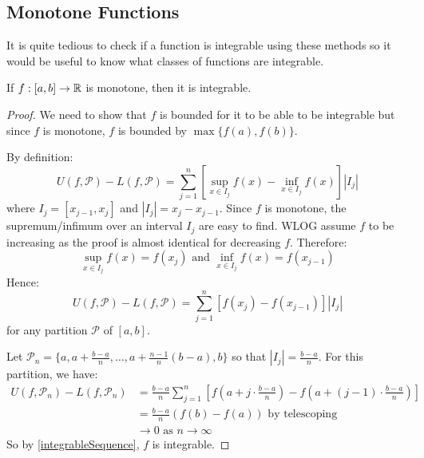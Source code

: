 \documentclass[../main.tex]{subfiles}
\begin{document}
\subsection{Monotone Functions}
It is quite tedious to check if a function is integrable using these methods so it would be useful to know what classes of functions are integrable.
\begin{proposition}
  If $f: [a, b] \to \mathbb{R}$ is monotone, then it is integrable.
  \label{motoneIntegrable}
\end{proposition}
\begin{proof}
  We need to show that $f$ is bounded for it to be able to be integrable but since $f$ is monotone, $f$ is bounded by $\max\{f(a), f(b)\}$.

  By definition:
  \[
    U(f, \mathcal{P}) -L(f, \mathcal{P}) = \sum_{j = 1}^{n} \left[\sup_{x \in I_{j}} f(x) - \inf_{x \in I_j} f(x)\right]|I_j|
  \]
  where $I_j = [x_{j - 1}, x_j]$ and $|I_j| = x_j - x_{j - 1}$.
  Since $f$ is monotone, the supremum/infimum over an interval $I_j$ are easy to find.
  WLOG assume $f$ to be increasing as the proof is almost identical for decreasing $f$.
  Therefore:
  \[
    \sup_{x \in I_j} f(x) = f(x_j) \text{ and } \inf_{x \in I_j}  f(x) = f(x_{j - 1})
  \]
  Hence:
  \[
    U(f, \mathcal{P}) - L(f, \mathcal{P}) = \sum_{j = 1}^{n} [f(x_j) - f(x_{j - 1})]|I_j|
  \]
  for any partition $\mathcal{P}$ of $[a, b]$.

  Let $\mathcal{P}_n = \{a, a + \frac{b - a}{n}, \ldots, a + \frac{n - 1}{n}(b - a), b\}$ so that $|I_j| = \frac{b - a}{n}$.
  For this partition, we have:
  \begin{align*}
    U(f, \mathcal{P}_n) - L(f, \mathcal{P}_n) &= \frac{b - a}{n} \sum_{j = 1}^{n} \left[f\left(a + j \cdot \frac{b - a}{n}\right) - f\left(a + (j - 1) \cdot\frac{b - a}{n}\right)\right] \\
                                              &= \frac{b - a}{n} (f(b) - f(a)) \text{ by telescoping} \\
                                              &\to 0 \text{ as } n \to \infty
  \end{align*}
  So by \cref{integrableSequence}, $f$ is integrable.
\end{proof}
\end{document}
